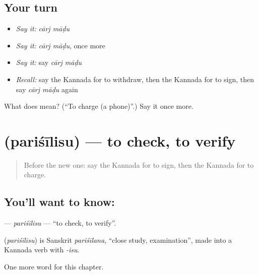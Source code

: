 \subsection*{Your turn}
\begin{itemize}
\raggedright
  \item \emph{Say it:} \emph{cārj māḍu}
  \item \emph{Say it:} \emph{cārj māḍu}, once more
  \item \emph{Say it:} say \emph{cārj māḍu}
  \item \emph{Recall:} say the Kannada for to withdraw, then the Kannada for to sign, then say \emph{cārj māḍu} again
\end{itemize}

\begin{tcolorbox}[breakable,colback=teal!4,colframe=teal!35!black,title={Before you move on}]
What does   mean? (\textquotedblleft{}To charge (a phone)\textquotedblright{}.) Say it once more.
\end{tcolorbox}
\section[\texorpdfstring{\kn{ಪರಿಶೀಲಿಸು} (pariśīlisu)}{ಪರಿಶೀಲಿಸು (pariśīlisu)}]{ (pariśīlisu) — to check, to verify}

\label{lesson:KA-C275-parisilisu}



\begin{quote}
Before the new one: say the Kannada for to sign, then the Kannada for to charge.
\end{quote}

\subsection*{You'll want to know: }
\textbf{} — \emph{pariśīlisu} — \textquotedblleft{}to check, to verify\textquotedblright{}.

\begin{cousinweb}
\textbf{} (\emph{pariśīlisu}) is Sanskrit \emph{pariśīlana}, \textquotedblleft{}close study, examination\textquotedblright{}, made into a Kannada verb with \emph{-isu}.
\end{cousinweb}

\begin{grammarlens}[title={What you've built}]
One more word for this chapter.
\end{grammarlens}

